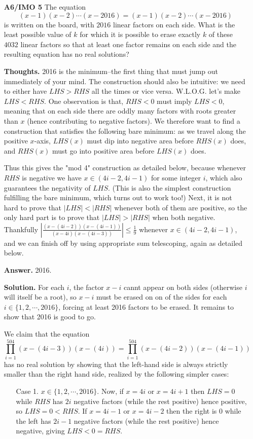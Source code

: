 \documentclass[11pt,a4paper]{article}
\begin{document}
\begin{itemize}
\newpage
\item[\textbf{A6/IMO 5}]
The equation
$$(x-1)(x-2)\cdots(x-2016)=(x-1)(x-2)\cdots (x-2016)$$is written on the board, with $2016$ linear factors on each side. What is the least possible value of $k$ for which it is possible to erase exactly $k$ of these $4032$ linear factors so that at least one factor remains on each side and the resulting equation has no real solutions?

\textbf{Thoughts.} 2016 is the minimum--the first thing that must jump out immediately of your mind. 
The construction should also be intuitive: we need to either have $LHS>RHS$ all the times or vice versa. 
W.L.O.G. let's make $LHS<RHS$. One observation is that, $RHS<0$ must imply $LHS<0$, meaning that on each side there are oddly many factors with roots greater than $x$ (hence contributing to negative factors). We therefore want to find a construction that satisfies the following bare minimum: as we travel along the positive $x$-axis, $LHS(x)$ must dip into negative area before $RHS(x)$ does, and $RHS(x)$ must go into positive area before $LHS(x)$ does. 

Thus this gives the "mod 4" construction as detailed below, because whenever $RHS$ is negative we have $x\in (4i-2, 4i-1)$ for some integer $i$, which also guarantees the negativity of $LHS$. (This is also the simplest construction fulfilling the bare minimum, which turns out to work too!)
Next, it is not hard to prove that $|LHS|<|RHS|$ whenever both of them are positive, 
so the only hard part is to prove that $|LHS|>|RHS|$ when both negative. 
Thankfully $|\frac{(x-(4i-2))(x-(4i-1))}{(x-4i)(x-(4i-3))}|\le \frac 19$ whenever $x\in (4i-2, 4i-1)$, and we can finish off by using appropriate sum telescoping, again as detailed below. 

\textbf{Answer.} 2016.

\textbf{Solution.}  
For each $i$, the factor $x-i$ cannt appear on both sides (otherwise $i$ will itself be a root), 
so $x-i$ must be erased on on of the sides for each $i\in \{1, 2, \cdots , 2016\}$, forcing at least 2016 factors to be erased. 
It remains to show that 2016 is good to go. 

We claim that the equation 
$$\displaystyle\prod_{i=1}^{504} (x-(4i-3))(x-(4i))=\displaystyle\prod_{i=1}^{504} (x-(4i-2))(x-(4i-1))$$ 
has no real solution by showing that the left-hand side is always strictly smaller than the right hand side, realized by the following simpler cases: 
\begin{itemize}
\item [Case 1.] 
$x\in\{1,2,\cdots ,2016\}$. 
Now, if $x=4i$ or $x=4i+1$ then $LHS=0$ while $RHS$ has $2i$ negative factors (while the rest positive) hence positive, 
so $LHS=0<RHS$. 
If $x=4i-1$ or $x=4i-2$ then the right is 0 while the left has $2i-1$ negative factors (while the rest positive) hence negative, 
giving $LHS<0=RHS$. 


\end{itemize}
\end{itemize}
\end{document}
